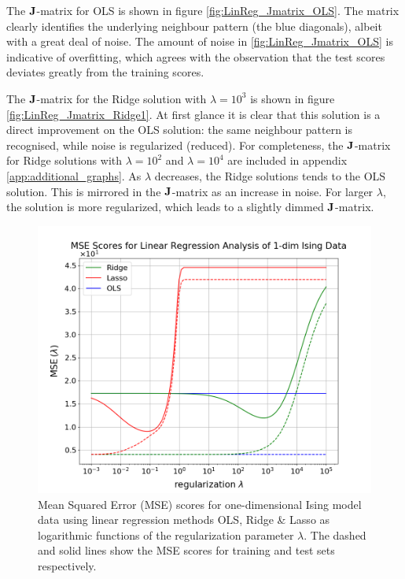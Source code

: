 \documentclass[nofootinbib,reprint,english]{revtex4-1}
\begin{document}
The \(\vb{J}\)-matrix for OLS is shown in figure \ref{fig:LinReg_Jmatrix_OLS}. The matrix clearly identifies the underlying neighbour pattern (the blue diagonals), albeit with a great deal of noise. The amount of noise in \eqref{fig:LinReg_Jmatrix_OLS} is indicative of overfitting, which agrees with the observation that the test scores deviates greatly from the training scores.

The \(\vb{J}\)-matrix for the Ridge solution with \(\lambda=10^3\) is shown in figure \ref{fig:LinReg_Jmatrix_Ridge1}. At first glance it is clear that this solution is a direct improvement on the OLS solution: the same neighbour pattern is recognised, while noise is regularized (reduced). For completeness, the \(\vb{J}\)-matrix for Ridge solutions with \(\lambda=10^2\) and \(\lambda=10^4\) are included in appendix \eqref{app:additional_graphs}. As \(\lambda\) decreases, the Ridge solutions tends to the OLS solution. This is mirrored in the \(\vb{J}\)-matrix as an increase in noise. For larger \(\lambda\), the solution is more regularized, which leads to a slightly dimmed \(\vb{J}\)-matrix.

\begin{figure}[hb]
\centering
\includegraphics[scale=0.29]{../output/LinReg/gridsearch_MSE.png}
\caption{Mean Squared Error (MSE) scores for one-dimensional Ising model data using linear regression methods OLS, Ridge \& Lasso as logarithmic functions of the regularization parameter \(\lambda\). The dashed and solid lines show the MSE scores for training and test sets respectively.}\label{fig:LinReg_MSE}
\end{figure}
\end{document}

